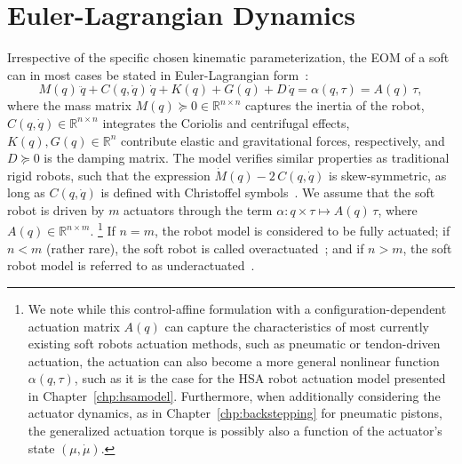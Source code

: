 \section{Euler-Lagrangian Dynamics}\label{sec:background:dynamics}
Irrespective of the specific chosen kinematic parameterization, the \gls{EOM} of a soft can in most cases be stated in Euler-Lagrangian form~\citep{della2023model}:
\begin{equation}\label{eq:background:dynamics:eom}
    M(q) \, \ddot{q} + C(q, \dot{q}) \, \dot{q} + K(q) + G(q) + D \, \dot{q} = \alpha(q,\tau) = A(q) \, \tau,
\end{equation}
where the mass matrix $M(q) \succeq 0 \in \mathbb{R}^{n \times n}$
captures the inertia of the robot, $C(q,\dot{q}) \in \mathbb{R}^{n \times n}$ integrates the Coriolis and centrifugal effects, $K(q), G(q) \in \mathbb{R}^{n}$ contribute elastic and gravitational forces, respectively, and $D \succeq 0$ is the damping matrix.
The model verifies similar properties as traditional rigid robots, such that the expression $\dot{M}(q) - 2 \, C(q,\dot{q})$ is skew-symmetric, as long as $C(q,\dot{q})$ is defined with Christoffel symbols~\citep{della2020model}.
We assume that the soft robot is driven by $m$ actuators through the term $\alpha: q \times \tau \mapsto A(q) \, \tau$, where $A(q) \in \mathbb{R}^{n \times m}$. \footnote{We note while this control-affine formulation with a configuration-dependent actuation matrix $A(q)$ can capture the characteristics of most currently existing soft robots actuation methods, such as pneumatic or tendon-driven actuation, the actuation can also become a more general nonlinear function $\alpha(q,\tau)$, such as it is the case for the \gls{HSA} robot actuation model presented in Chapter~\ref{chp:hsamodel}. Furthermore, when additionally considering the actuator dynamics, as in Chapter~\ref{chp:backstepping} for pneumatic pistons, the generalized actuation torque is possibly also a function of the actuator's state $(\mu,\dot{\mu})$.}
If $n=m$, the robot model is considered to be fully actuated; if $n < m$ (rather rare), the soft robot is called overactuated~\citep{pustina2024input}; and if $n > m$, the soft robot model is referred to as underactuated~\citep{pustina2025analysis}.

